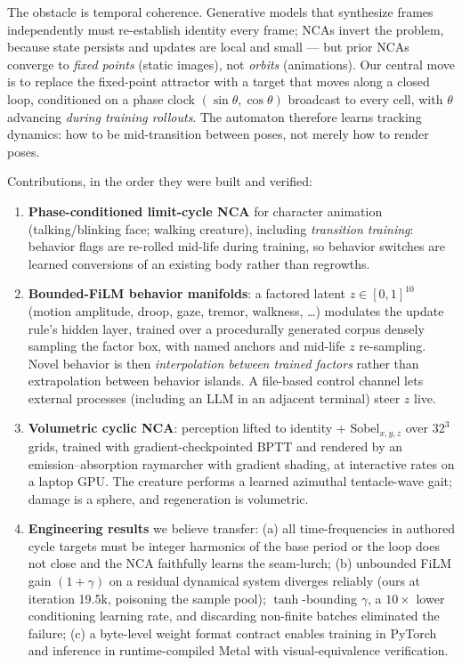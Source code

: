 \documentclass[11pt]{article}
\begin{document}
The obstacle is temporal coherence. Generative models that synthesize frames
independently must re-establish identity every frame; NCAs invert the problem,
because state persists and updates are local and small --- but prior NCAs
converge to \emph{fixed points} (static images), not \emph{orbits}
(animations). Our central move is to replace the fixed-point attractor with a
target that moves along a closed loop, conditioned on a phase clock
$(\sin\theta, \cos\theta)$ broadcast to every cell, with $\theta$ advancing
\emph{during training rollouts}. The automaton therefore learns tracking
dynamics: how to be mid-transition between poses, not merely how to render
poses.

Contributions, in the order they were built and verified:
\begin{enumerate}
  \item \textbf{Phase-conditioned limit-cycle NCA} for character animation
  (talking/blinking face; walking creature), including \emph{transition
  training}: behavior flags are re-rolled mid-life during training, so
  behavior switches are learned conversions of an existing body rather than
  regrowths.
  \item \textbf{Bounded-FiLM behavior manifolds}: a factored latent
  $z \in [0,1]^{10}$ (motion amplitude, droop, gaze, tremor, walkness,
  \ldots) modulates the update rule's hidden layer, trained over a
  procedurally generated corpus densely sampling the factor box, with named
  anchors and mid-life $z$ re-sampling. Novel behavior is then
  \emph{interpolation between trained factors} rather than extrapolation
  between behavior islands. A file-based control channel lets external
  processes (including an LLM in an adjacent terminal) steer $z$ live.
  \item \textbf{Volumetric cyclic NCA}: perception lifted to
  identity + Sobel$_{x,y,z}$ over $32^3$ grids, trained with
  gradient-checkpointed BPTT and rendered by an emission--absorption
  raymarcher with gradient shading, at interactive rates on a laptop GPU. The
  creature performs a learned azimuthal tentacle-wave gait; damage is a
  sphere, and regeneration is volumetric.
  \item \textbf{Engineering results} we believe transfer: (a) all
  time-frequencies in authored cycle targets must be integer harmonics of the
  base period or the loop does not close and the NCA faithfully learns the
  seam-lurch; (b) unbounded FiLM gain $(1+\gamma)$ on a residual dynamical
  system diverges reliably (ours at iteration 19.5k, poisoning the sample
  pool); $\tanh$-bounding $\gamma$, a $10\times$ lower conditioning learning
  rate, and discarding non-finite batches eliminated the failure; (c) a
  byte-level weight format contract enables training in PyTorch and inference
  in runtime-compiled Metal with visual-equivalence verification.
\end{enumerate}
\end{document}

